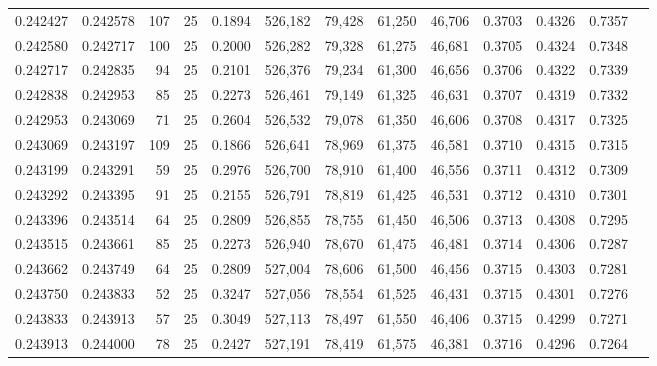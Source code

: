 \begin{tabular}{rrrrrrrrrrrrr}
0.242427 & 0.242578 &   107 &  25 &                                     0.1894 & 526,182 &  79,428 &  61,250 &  46,706 & 0.3703 & 0.4326 & 0.7357 \\
0.242580 & 0.242717 &   100 &  25 &                                     0.2000 & 526,282 &  79,328 &  61,275 &  46,681 & 0.3705 & 0.4324 & 0.7348 \\
0.242717 & 0.242835 &    94 &  25 &                                     0.2101 & 526,376 &  79,234 &  61,300 &  46,656 & 0.3706 & 0.4322 & 0.7339 \\
0.242838 & 0.242953 &    85 &  25 &                                     0.2273 & 526,461 &  79,149 &  61,325 &  46,631 & 0.3707 & 0.4319 & 0.7332 \\
0.242953 & 0.243069 &    71 &  25 &                                     0.2604 & 526,532 &  79,078 &  61,350 &  46,606 & 0.3708 & 0.4317 & 0.7325 \\
0.243069 & 0.243197 &   109 &  25 &                                     0.1866 & 526,641 &  78,969 &  61,375 &  46,581 & 0.3710 & 0.4315 & 0.7315 \\
0.243199 & 0.243291 &    59 &  25 &                                     0.2976 & 526,700 &  78,910 &  61,400 &  46,556 & 0.3711 & 0.4312 & 0.7309 \\
0.243292 & 0.243395 &    91 &  25 &                                     0.2155 & 526,791 &  78,819 &  61,425 &  46,531 & 0.3712 & 0.4310 & 0.7301 \\
0.243396 & 0.243514 &    64 &  25 &                                     0.2809 & 526,855 &  78,755 &  61,450 &  46,506 & 0.3713 & 0.4308 & 0.7295 \\
0.243515 & 0.243661 &    85 &  25 &                                     0.2273 & 526,940 &  78,670 &  61,475 &  46,481 & 0.3714 & 0.4306 & 0.7287 \\
0.243662 & 0.243749 &    64 &  25 &                                     0.2809 & 527,004 &  78,606 &  61,500 &  46,456 & 0.3715 & 0.4303 & 0.7281 \\
0.243750 & 0.243833 &    52 &  25 &                                     0.3247 & 527,056 &  78,554 &  61,525 &  46,431 & 0.3715 & 0.4301 & 0.7276 \\
0.243833 & 0.243913 &    57 &  25 &                                     0.3049 & 527,113 &  78,497 &  61,550 &  46,406 & 0.3715 & 0.4299 & 0.7271 \\
0.243913 & 0.244000 &    78 &  25 &                                     0.2427 & 527,191 &  78,419 &  61,575 &  46,381 & 0.3716 & 0.4296 & 0.7264 \\

\end{tabular}

